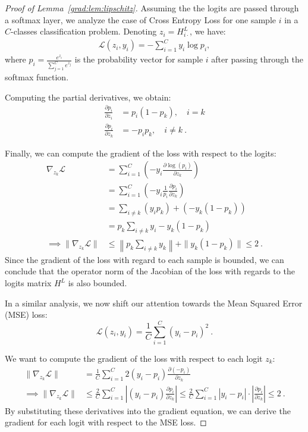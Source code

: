 \begin{proof}[Proof of Lemma~\ref{grad:lem:lipschitz}]

Assuming the the logits are passed through a softmax layer, we analyze the case of Cross Entropy Loss for one sample $i$ in a $C$-classes classification problem. Denoting $z_i = H^L_{i\cdot}$, we have:
\begin{align}
    \mathcal{L}(z_i, y_i) = -\sum_{i=1}^C y_i \log p_i,
\end{align}
where $p_i = \frac{e^{z_i}}{\sum_{j=1}^C e^{z_j}}$ is the probability vector for sample $i$ after passing through the softmax function.

Computing the partial derivatives, we obtain:
\begin{align}
    \frac{\partial p_i}{\partial z_i} &= p_i (1 - p_k), \quad i=k \\
    \frac{\partial p_i}{\partial z_k} &= - p_i p_k, \quad i\neq k~.
\end{align}

Finally, we can compute the gradient of the loss with respect to the logits:
\begin{align}
    \nabla_{z_k}\mathcal{L} &= \sum_{i=1}^{C} \left( -y_i \frac{\partial \log(p_i)}{\partial z_k} \right) \\
   & = \sum_{i=1}^{C} \left( -y_i \frac{1}{p_i}\frac{\partial p_i}{\partial z_k} \right) \\
    &= \sum_{i\neq k} (y_i p_k) + (-y_k (1-p_k))\\
    &= p_k\sum_{i\neq k}y_i - y_k (1-p_k) \\
  \implies  \|\nabla_{z_k}\mathcal{L}\| &\le \left\|p_k \sum_{i\neq k} y_k\right\| + \|y_k (1-p_k)\| \le 2~.
\end{align}
Since the gradient of the loss with regard to each sample is bounded, we can conclude that the operator norm of the Jacobian of the loss with regards to the logits matrix $H^L$ is also bounded.


In a similar analysis, we now shift our attention towards the Mean Squared Error (MSE) loss:
\[ \mathcal{L}(z_i, y_i) = \frac{1}{C} \sum_{i=1}^{C} (y_i - p_i)^2~. \]

We want to compute the gradient of the loss with respect to each logit \( z_k \):
\begin{align}
    \| \nabla_{z_k}\mathcal{L} \| &= \frac{1}{C} \sum_{i=1}^{C} 2(y_i - p_i) \frac{\partial (-p_i)}{\partial z_k} \\
  \implies \| \nabla_{z_k}\mathcal{L} \|  &\le \frac2C \sum_{i=1}^C \left|(y_i - p_i)\frac{\partial p_i}{\partial z_k} \right|
    \le \frac2C \sum_{i=1}^C |y_i - p_i| \cdot \left|\frac{\partial p_i}{\partial z_k}\right| \leq 2~.
\end{align}
By substituting these derivatives into the gradient equation, we can derive the gradient for each logit with respect to the MSE loss.

\end{proof}


